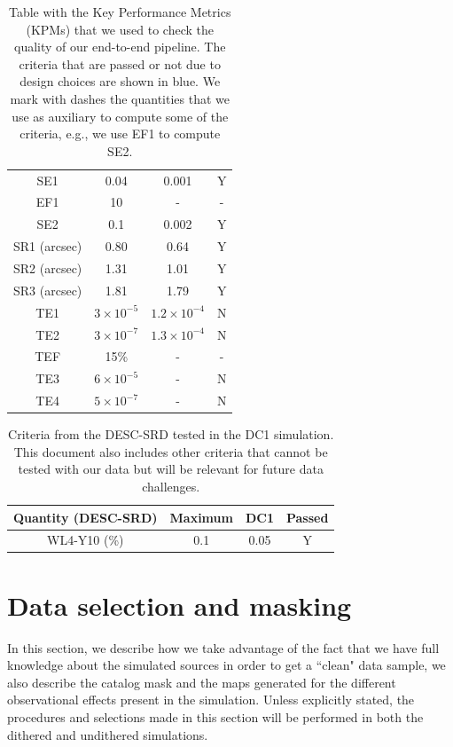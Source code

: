 \documentclass[twocolumn]{aastex62}
\newcommand{\rachel}[1]{{\textcolor{cyan}{{\textbf (RM: #1)}}}}
\begin{document}
\begin{table}[h!]
\begin{tabular}{|c|c|c|c|}
SE1 & 0.04 & 0.001 & Y\\
EF1 & 10 & - & -\\
SE2 & 0.1 & 0.002 & Y\\
SR1 (arcsec) & 0.80 & 0.64 & Y\\
SR2 (arcsec) & 1.31 & 1.01 & Y\\
SR3 (arcsec) & 1.81 & 1.79 & Y\\
TE1 & $3 \times 10^{-5}$ & $1.2\times 10^{-4}$ & N\\
TE2 & $3 \times 10^{-7}$ & $1.3\times 10^{-4}$ & N\\
TEF & 15\% & - & -\\
TE3 & $6 \times 10^{-5}$ & - & N\\
TE4 & $5 \times 10^{-7}$ & - & N\\
\hline
\end{tabular}
\caption{Table with the Key Performance Metrics (KPMs) that we used to check the quality of our end-to-end pipeline. The criteria that are passed or not due to design choices are shown in blue. We mark with dashes the quantities that we use as auxiliary to compute some of the criteria, e.g., we use EF1 to compute SE2.}
\label{tab:kpm_table}
\end{table}

\begin{table}[h!]
\centering
\begin{tabular}{|c|c|c|c|}
\hline
Quantity (DESC-SRD) & Maximum & DC1 & Passed \\
\hline
WL4-Y10 (\%) & 0.1 & 0.05 & Y\\
\hline
\end{tabular}
\caption{Criteria from the DESC-SRD tested in the DC1 simulation. This document also includes other criteria that cannot be tested with our data but will be relevant for future data challenges.}
\label{tab:desc_srd_table}
\end{table}


\section{Data selection and masking}
\label{sec:data_selection}
In this section, we describe how we take advantage of the fact that we have full knowledge about the simulated sources in order to get a ``clean" data sample, we also describe the catalog mask and the maps generated for the different observational effects present in the simulation. Unless explicitly stated, the procedures and selections made in this section will be performed in both the dithered and undithered simulations.
\end{document}
